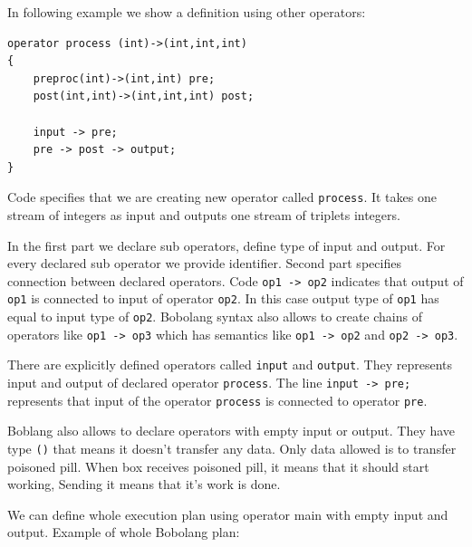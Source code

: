 In following example we show a definition using other operators:

\begin{verbatim}
operator process (int)->(int,int,int)
{
    preproc(int)->(int,int) pre;
    post(int,int)->(int,int,int) post;
	
    input -> pre;
    pre -> post -> output;
}
\end{verbatim}

Code specifies that we are creating new operator called \verb|process|. It takes one stream of integers as input and outputs one stream of triplets integers. 

In the first part we declare sub operators, define type of input and output. For every declared sub operator we provide identifier. Second part specifies connection between declared operators. Code \verb|op1 -> op2| indicates that output of \verb|op1| is connected to input of operator \verb|op2|. In this case output type of \verb|op1| has equal to input type of \verb|op2|. Bobolang syntax also allows to create chains of operators like \verb|op1 -> op3| which has semantics like \verb|op1 -> op2| and \verb|op2 -> op3|. 

There are explicitly defined operators called \verb|input| and \verb|output|. They represents input and output of declared operator \verb|process|. The line \verb|input -> pre;| represents that input of the operator \verb|process| is connected to operator \verb|pre|.

Boblang also allows to declare operators with empty input or output. They have type \verb|()| that means it doesn't transfer any data. Only data allowed is to transfer poisoned pill. When box receives poisoned pill, it means that it should start working, Sending it means that it's work is done.

We can define whole execution plan using operator main with empty input and output. Example of whole Bobolang plan:

